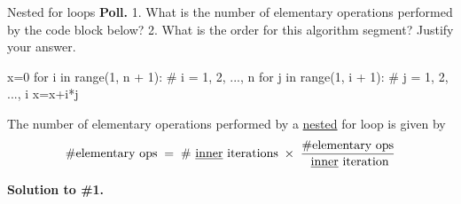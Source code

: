 \documentclass[10pt]{beamer}
\begin{document}
\begin{frame}[fragile]{Nested for loops}
\footnotesize 
\colorbox{yellow!30}{\textbf{Poll.}} 1. What is the number of elementary operations performed by the code block below? 2. What is the order for this algorithm segment? Justify your answer.

\begin{myredbox}[title=\text{An algorithm segment (in Python) with a nested for loop }]
\begin{python}
x=0
for i in range(1, n + 1):       # i = 1, 2, ..., n
    for j in range(1, i + 1):   # j = 1, 2, ..., i
        x=x+i*j
\end{python}
\vspace{-.2cm}
\end{myredbox}
\vfill 
\pause 


\begin{mybluebox}[title=\text{The number of elementary operations performed by a \underline{nested} for loop}]
The number of elementary operations performed by a  \underline{nested} for loop is given by
\[ \#  \text{elementary ops} \; = \; \#  \text{ \underline{inner} iterations}   \; \times \; \frac{\# \text{elementary ops}}{\text{ \underline{inner} iteration}} \]	
\end{mybluebox}

\vfill 
\pause 
\colorbox{yellow!30}{\textbf{Solution to \#1.}}



 
\end{frame}
\end{document}
